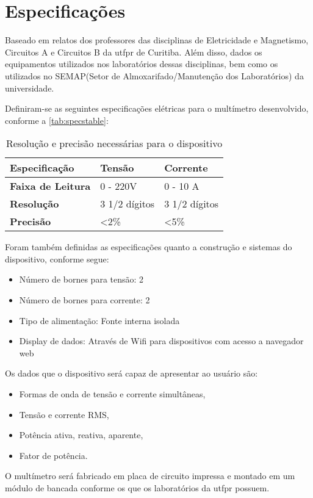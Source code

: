 \chapter{Especificações}\label{cap:especificacoes}
Baseado em relatos dos professores das disciplinas de Eletricidade e Magnetismo, Circuitos A e Circuitos B da \gls{utfpr} de Curitiba. Além disso, dados os equipamentos utilizados nos laboratórios dessas disciplinas, bem como os utilizados no \gls{SEMAP}(Setor de Almoxarifado/Manutenção dos Laboratórios) da universidade.

Definiram-se as seguintes especificações elétricas para o multímetro desenvolvido, conforme a \autoref{tab:specstable}:

\begin{table}[!ht]
    \centering
    \caption{Resolução e precisão necessárias para o dispositivo}
    \label{tab:specstable}
    \begin{tabular}{|l|l|l|}
    \hline
        \textbf{Especificação} & \textbf{Tensão} & \textbf{Corrente} \\ \hline
        \textbf{Faixa de Leitura} & 0 - 220V & 0 - 10 A \\ \hline
        \textbf{Resolução} & 3 1/2 dígitos & 3 1/2 dígitos \\ \hline
        \textbf{Precisão} & <2\% & <5\% \\ \hline
    \end{tabular}   
\end{table}

Foram também definidas as especificações quanto a construção e sistemas do dispositivo, conforme segue:

\begin{itemize}
    \item Número de bornes para tensão: 2
    \item Número de bornes para corrente: 2
    \item Tipo de alimentação: Fonte interna isolada
    \item Display de dados: Através de Wifi para dispositivos com acesso a navegador web
\end{itemize}

Os dados que o dispositivo será capaz de apresentar ao usuário são:

\begin{itemize}
    \item Formas de onda de tensão e corrente simultâneas,
    \item Tensão e corrente RMS,
    \item Potência ativa, reativa, aparente,
    \item Fator de potência.
\end{itemize}

O multímetro será fabricado em placa de circuito impressa e montado em um módulo de bancada conforme os que os laboratórios da \gls{utfpr} possuem.